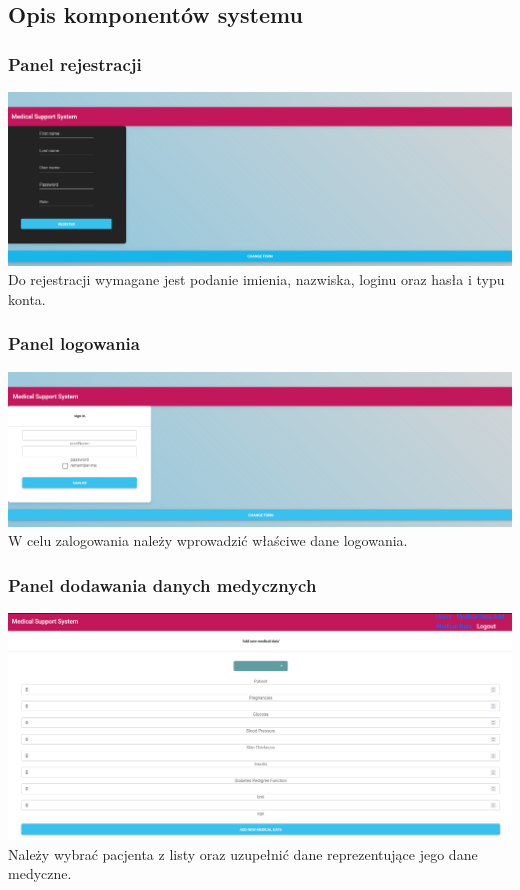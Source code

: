 \documentclass[12pt,a4paper]{article}
\begin{document}
    \subsection*{Opis komponentów systemu}
    
    \subsubsection*{Panel rejestracji}
    \includegraphics[width=\textwidth,height=\textheight,keepaspectratio]{register.png}
    Do rejestracji wymagane jest podanie imienia, nazwiska, loginu oraz hasła i typu konta.
    
    \subsubsection*{Panel logowania}
    \includegraphics[width=\textwidth,height=\textheight,keepaspectratio]{login.png}
    W celu zalogowania należy wprowadzić właściwe dane logowania.
    
    \subsubsection*{Panel dodawania danych medycznych}
    \includegraphics[width=\textwidth,height=\textheight,keepaspectratio]{Add_medical_data.png}
    \newline
    Należy wybrać pacjenta z listy oraz uzupełnić dane reprezentujące jego dane medyczne.
    
\end{document}
